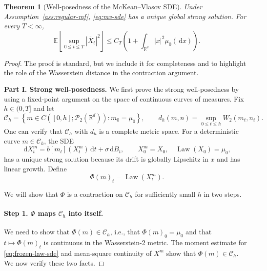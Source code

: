 \documentclass[11pt]{amsart}
\numberwithin{equation}{section}
\theoremstyle{plain}
\newtheorem{theorem}{Theorem}[section]
\newcommand{\R}{\mathbb{R}}
\newcommand{\E}{\mathbb{E}}
\newcommand{\cP}{\mathcal{P}}
\newcommand{\dd}{\,\mathrm{d}}
\newcommand{\abs}[1]{\left\lvert#1\right\rvert}
\DeclareMathOperator{\Law}{Law}
\begin{document}
\begin{theorem}[Well-posedness of the McKean--Vlasov SDE]
\label{thm:mv-wellposed}
Under Assumption~\ref{ass:regular-mf}, \eqref{eq:mv-sde} has a unique global
strong solution.  For every $T<\infty$,
\begin{equation}\label{eq:mv-moment}
 \E\left[\sup_{0\leq t\leq T}\abs{\overline X_t}^2\right]
 \leq C_T\left(1+\int_{\R^d}\abs{x}^2\mu_0(\dd x)\right).
\end{equation}
\end{theorem}
\begin{proof}   The proof is standard, but we include it for completeness and to highlight the role of the Wasserstein distance in the contraction argument. 

\textbf{Part I. Strong well-posedness.}  We first prove the strong well-posedness by using a fixed-point argument on the space of continuous curves of measures. 
Fix $h\in (0,T]$ and let
\[
 \mathcal C_h=\left\{m\in C([0,h];\cP_2(\R^d)):m_0=\mu_0\right\},
 \qquad d_h(m,n)=\sup_{0\leq t\leq h}W_2(m_t,n_t).
\]
One can verify that $\mathcal C_h$ with $d_h$ is a complete metric space.  For a deterministic curve $m\in\mathcal
C_h$, the SDE
\begin{equation}\label{eq:frozen-law-sde}
 \dd X_t^m=b[m_t](X_t^m)\dd t+\sigma\dd B_t,
 \qquad X_0^m=X_0,\quad\Law(X_0)=\mu_0,
\end{equation}
has a unique strong solution because its drift is globally Lipschitz in $x$
and has linear growth.  Define
$$\Phi(m)_t=\Law(X_t^m).$$  

We will show that $\Phi$ is a contraction on $\mathcal C_h$ for sufficiently small $h$ in two steps. 

\paragraph{\textbf{Step 1. $\Phi$ maps $\mathcal C_h$ into itself.}}  We need to show that $\Phi(m)\in\mathcal C_h$, i.e., that $\Phi(m)_0=\mu_0$ and that $t\mapsto \Phi(m)_t$ is continuous in the Wasserstein-2 metric.
The moment estimate for
\eqref{eq:frozen-law-sde} and mean-square continuity of $X^m$ show that
$\Phi(m)\in\mathcal C_h$.  We now verify these two facts.


\end{proof}
\end{document}
